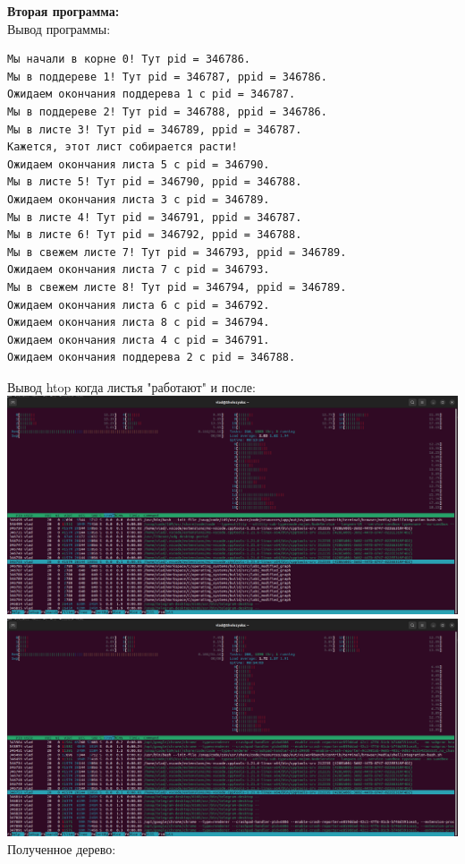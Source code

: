 \documentclass[a4paper,14pt]{extarticle}
\begin{document}
\textbf{Вторая программа:}\\
Вывод программы:\\
\begin{verbatim}
Мы начали в корне 0! Тут pid = 346786.
Мы в поддереве 1! Тут pid = 346787, ppid = 346786.
Ожидаем окончания поддерева 1 с pid = 346787.
Мы в поддереве 2! Тут pid = 346788, ppid = 346786.
Мы в листе 3! Тут pid = 346789, ppid = 346787.
Кажется, этот лист собирается расти!
Ожидаем окончания листа 5 с pid = 346790.
Мы в листе 5! Тут pid = 346790, ppid = 346788.
Ожидаем окончания листа 3 с pid = 346789.
Мы в листе 4! Тут pid = 346791, ppid = 346787.
Мы в листе 6! Тут pid = 346792, ppid = 346788.
Мы в свежем листе 7! Тут pid = 346793, ppid = 346789.
Ожидаем окончания листа 7 с pid = 346793.
Мы в свежем листе 8! Тут pid = 346794, ppid = 346789.
Ожидаем окончания листа 6 с pid = 346792.
Ожидаем окончания листа 8 с pid = 346794.
Ожидаем окончания листа 4 с pid = 346791.
Ожидаем окончания поддерева 2 с pid = 346788.
\end{verbatim}
Вывод htop когда листья "работают" и после:\\
\includegraphics[width=140mm]{modified_htop_before}\\
\includegraphics[width=140mm]{modified_htop_after}\\
Полученное дерево:\\
\end{document}
